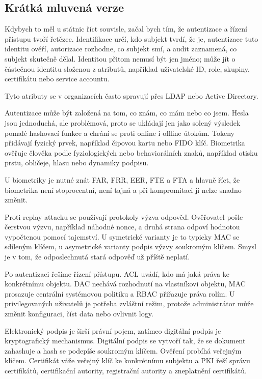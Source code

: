 \subsection*{Krátká mluvená verze}

Kdybych to měl u státnic říct souvisle, začal bych tím, že autentizace a řízení přístupu tvoří řetězec. Identifikace určí, kdo subjekt tvrdí, že je, autentizace tuto identitu ověří, autorizace rozhodne, co subjekt smí, a audit zaznamená, co subjekt skutečně dělal. Identitou přitom nemusí být jen jméno; může jít o částečnou identitu složenou z atributů, například uživatelské ID, role, skupiny, certifikátu nebo service accountu.

Tyto atributy se v organizacích často spravují přes LDAP nebo Active Directory.

Autentizace může být založená na tom, co znám, co mám nebo co jsem. Hesla jsou jednoduchá, ale problémová, proto se ukládají jen jako solený výsledek pomalé hashovací funkce a chrání se proti online i offline útokům. Tokeny přidávají fyzický prvek, například čipovou kartu nebo FIDO klíč. Biometrika ověřuje člověka podle fyziologických nebo behaviorálních znaků, například otisku prstu, obličeje, hlasu nebo dynamiky podpisu.

U biometriky je nutné znát FAR, FRR, EER, FTE a FTA a hlavně říct, že biometrika není stoprocentní, není tajná a při kompromitaci ji nelze snadno změnit.

Proti replay attacku se používají protokoly výzva-odpověď. Ověřovatel pošle čerstvou výzvu, například náhodné nonce, a druhá strana odpoví hodnotou vypočtenou pomocí tajemství. U symetrické varianty je to typicky MAC se sdíleným klíčem, u asymetrické varianty podpis výzvy soukromým klíčem. Smysl je v tom, že odposlechnutá stará odpověď už příště neplatí.

Po autentizaci řešíme řízení přístupu. ACL uvádí, kdo má jaká práva ke konkrétnímu objektu. DAC nechává rozhodnutí na vlastníkovi objektu, MAC prosazuje centrální systémovou politiku a RBAC přiřazuje práva rolím. U privilegovaných uživatelů je potřeba zvláštní režim, protože administrátor může změnit konfiguraci, číst data nebo ovlivnit logy.

Elektronický podpis je širší právní pojem, zatímco digitální podpis je kryptografický mechanismus. Digitální podpis se vytvoří tak, že se dokument zahashuje a hash se podepíše soukromým klíčem. Ověření probíhá veřejným klíčem. Certifikát váže veřejný klíč ke konkrétnímu subjektu a PKI řeší správu certifikátů, certifikační autority, registrační autority a zneplatnění certifikátů.

